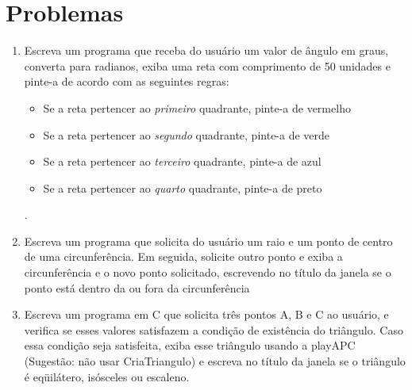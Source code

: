 



\section*{Problemas}
\begin{enumerate}
\item
  Escreva um programa que receba do usuário um valor de ângulo em graus, converta para radianos, exiba uma reta com comprimento de 50 unidades e pinte-a de acordo com as seguintes regras:
    \begin{itemize}
    \item
    Se a reta pertencer ao \emph{primeiro} quadrante, pinte-a de vermelho
    \item
    Se a reta pertencer ao \emph{segundo} quadrante, pinte-a de verde
    \item
    Se a reta pertencer ao \emph{terceiro} quadrante, pinte-a de azul
    \item
    Se a reta pertencer ao \emph{quarto} quadrante, pinte-a de preto
    \end{itemize}.
    \label{ex:cap01_ex4}
\item
  Escreva um programa que solicita do usuário um raio e um ponto de centro de uma circunferência. Em seguida, solicite outro ponto e exiba a circunferência e o novo ponto solicitado, escrevendo no título da janela se o ponto está dentro da ou fora da circunferência
    \label{ex:cap01_ex9}

\item
  Escreva um programa em C que solicita três pontos A, B e C ao usuário, e verifica se esses valores satisfazem a condição de existência do triângulo. Caso essa condição seja satisfeita, exiba esse triângulo usando a playAPC (Sugestão: não usar CriaTriangulo) e escreva no título da janela se o triângulo é eqüilátero, isósceles ou escaleno.

    \label{ex:cap01_ex10}
\end{enumerate}

